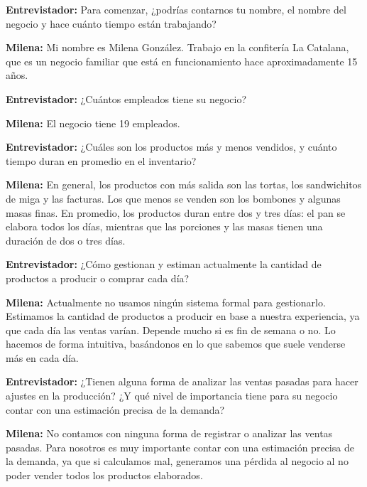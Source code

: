 
\textbf{Entrevistador:} Para comenzar, ¿podrías contarnos tu nombre, el nombre del negocio y hace cuánto tiempo están trabajando?  

\textbf{Milena:} Mi nombre es Milena González. Trabajo en la confitería La Catalana, que es un negocio familiar que está en funcionamiento hace aproximadamente 15 años.  

\vspace{0.5em}

\textbf{Entrevistador:} ¿Cuántos empleados tiene su negocio?  

\textbf{Milena:} El negocio tiene 19 empleados.  

\vspace{0.5em}

\textbf{Entrevistador:} ¿Cuáles son los productos más y menos vendidos, y cuánto tiempo duran en promedio en el inventario?  

\textbf{Milena:} En general, los productos con más salida son las tortas, los sandwichitos de miga y las facturas.  
Los que menos se venden son los bombones y algunas masas finas.  
En promedio, los productos duran entre dos y tres días: el pan se elabora todos los días, mientras que las porciones y las masas tienen una duración de dos o tres días.  

\vspace{0.5em}

\textbf{Entrevistador:} ¿Cómo gestionan y estiman actualmente la cantidad de productos a producir o comprar cada día?  

\textbf{Milena:} Actualmente no usamos ningún sistema formal para gestionarlo. Estimamos la cantidad de productos a producir en base a nuestra experiencia, ya que cada día las ventas varían. Depende mucho si es fin de semana o no. Lo hacemos de forma intuitiva, basándonos en lo que sabemos que suele venderse más en cada día.  

\vspace{0.5em}

\textbf{Entrevistador:} ¿Tienen alguna forma de analizar las ventas pasadas para hacer ajustes en la producción? ¿Y qué nivel de importancia tiene para su negocio contar con una estimación precisa de la demanda?  

\textbf{Milena:} No contamos con ninguna forma de registrar o analizar las ventas pasadas. Para nosotros es muy importante contar con una estimación precisa de la demanda, ya que si calculamos mal, generamos una pérdida al negocio al no poder vender todos los productos elaborados.  

